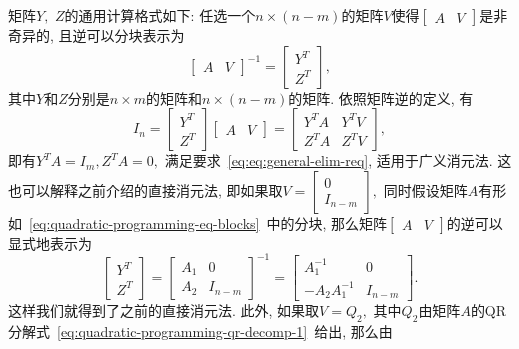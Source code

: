 \documentclass{SBCbookchapter}
\numberwithin{equation}{section}
\begin{document}
矩阵$Y,$ $Z$的通用计算格式如下: 任选一个$n \times (n - m)$的矩阵$V$使得$\begin{bmatrix} A & V \end{bmatrix}$是非奇异的, 且逆可以分块表示为
\begin{equation}
\label{eq:quadratic-programming-qr-decomp-general}
\begin{bmatrix} A & V \end{bmatrix}^{-1} = \begin{bmatrix} Y^T \\ Z^T \end{bmatrix},
\end{equation}
其中$Y$和$Z$分别是$n \times m$的矩阵和$n \times (n - m)$的矩阵. 依照矩阵逆的定义, 有
\begin{equation*}
I_n = \begin{bmatrix} Y^T \\ Z^T \end{bmatrix} \begin{bmatrix} A & V \end{bmatrix} = \begin{bmatrix} Y^T A & Y^T V \\ Z^T A & Z^T V \end{bmatrix},
\end{equation*}
即有$Y^T A = I_m, Z^T A = 0,$ 满足要求~\eqref{eq:eq:general-elim-req}, 适用于广义消元法. 这也可以解释之前介绍的直接消元法, 即如果取$V = \begin{bmatrix} 0 \\ I_{n - m} \end{bmatrix},$ 同时假设矩阵$A$有形如~\eqref{eq:quadratic-programming-eq-blocks}~中的分块, 那么矩阵$\begin{bmatrix} A & V \end{bmatrix}$的逆可以显式地表示为
\begin{equation*}
\begin{bmatrix} Y^T \\ Z^T \end{bmatrix} = \begin{bmatrix} A_1 & 0 \\ A_2 & I_{n - m} \end{bmatrix}^{-1} = \begin{bmatrix} A_1^{-1} & 0 \\ -A_2A_1^{-1} & I_{n - m} \end{bmatrix}.
\end{equation*}
这样我们就得到了之前的直接消元法. 此外, 如果取$V = Q_2,$ 其中$Q_2$由矩阵$A$的QR分解式~\eqref{eq:quadratic-programming-qr-decomp-1}~给出, 那么由
\end{document}
